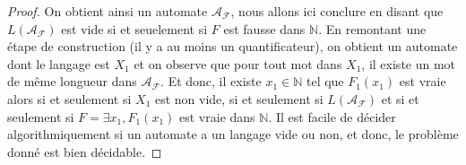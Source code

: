 \documentclass[12pt]{article}
\theoremstyle{break}
\begin{document}
\begin{proof}
On obtient ainsi un automate $\mathcal{A_{F}}$, nous allons ici conclure en disant que $L(\mathcal{A_{F}})$ est vide si et seuelement si $F$ est fausse dans $\mathbb{N}$. En remontant une étape de construction (il y a au moins un quantificateur), on obtient un automate dont le langage est $X_1$ et on observe que pour tout mot dans $X_1$, il existe un mot de m\^eme longueur dans $\mathcal{A_{F}}$. Et donc, il existe $x_1 \in \mathbb{N}$ tel que $F_1(x_1)$ est vraie alors si et seulement si $X_1$ est non vide, si et seulement si $L(\mathcal{A_{F}})$ et si et seulement si $F = \exists x_1, F_1(x_1)$ est vraie dans $\mathbb{N}$. Il est facile de décider algorithmiquement si un automate a un langage vide ou non, et donc, le problème donné est bien décidable.
\end{proof}
\end{document}
